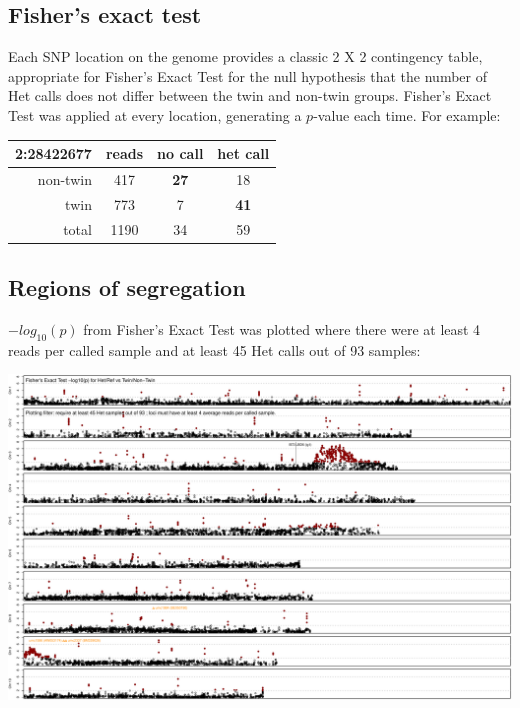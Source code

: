 \documentclass[a0,portrait]{a0poster}
\newlength{\figwidth}
\begin{document}
\begin{multicols}{3}
  \subsection*{Fisher's exact test}

  Each SNP location on the genome provides a classic 2 X 2 contingency table, appropriate for Fisher's Exact Test
  for the null hypothesis that the number of Het calls does not differ between the twin and non-twin groups.
  Fisher's Exact Test was applied at every location, generating a $p$-value each time. For example:

  \begin{center}
    \begin{tabular}{|r|c||c|c|}
      \hline
      \textbf{2:28422677} & reads & no call & het call \\
      \hline
      \hline
      non-twin   & 417   & \textbf{27} & 18 \\
      \hline
      twin       & 773   & 7  & \textbf{41} \\
      \hline
      \hline
      total      & 1190  & 34 & 59 \\
      \hline
    \end{tabular}
  \end{center}


  \subsection*{Regions of segregation}

  $-log_{10}(p)$ from Fisher's Exact Test was plotted where there were at least 4 reads per called sample and at least 45 Het calls out of 93 samples:
  
  \begin{center}
    \includegraphics[width=\figwidth]{Fisher-Het-45}
  \end{center}


\end{multicols}
\end{document}
